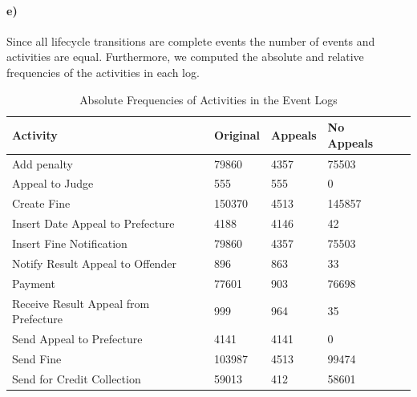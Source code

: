 \documentclass[12pt]{report}
\begin{document}
\paragraph{\textbf{e)}}


Since all lifecycle transitions are complete events the number of events and activities are equal. Furthermore, we computed the absolute and relative frequencies of the activities in each log.

\begin{table}[H]
\centering
\begin{tabular}{|l|l|l|l|l|}
\hline \textbf{Activity} & \textbf{Original} & \textbf{Appeals} & \textbf{No Appeals} \\
\hline Add penalty & 79860 & 4357 & 75503\\
\hline Appeal to Judge & 555 & 555 &0\\
\hline Create Fine & 150370 & 4513 & 145857\\
\hline Insert Date Appeal to Prefecture & 4188 & 4146 & 42\\
\hline Insert Fine Notification & 79860 & 4357 & 75503\\
\hline Notify Result Appeal to Offender & 896 & 863 & 33\\
\hline Payment  & 77601 & 903 & 76698\\
\hline Receive Result Appeal from Prefecture & 999 & 964 & 35\\
\hline Send Appeal to Prefecture  & 4141 & 4141 & 0\\
\hline Send Fine  & 103987 & 4513 & 99474\\
\hline Send for Credit Collection & 59013 & 412 & 58601\\
\hline
\end{tabular}
\caption{Absolute Frequencies of Activities in the Event Logs}
\label{tab:1c_absolut}
\end{table}
\end{document}
